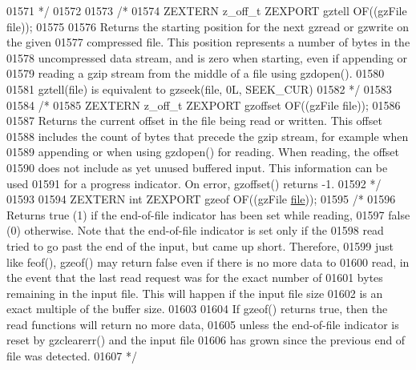 \begin{DoxyCode}
01571 \textcolor{comment}{*/}
01572 
01573 \textcolor{comment}{/*}
01574 \textcolor{comment}{ZEXTERN z\_off\_t ZEXPORT    gztell OF((gzFile file));}
01575 \textcolor{comment}{}
01576 \textcolor{comment}{     Returns the starting position for the next gzread or gzwrite on the given}
01577 \textcolor{comment}{   compressed file.  This position represents a number of bytes in the}
01578 \textcolor{comment}{   uncompressed data stream, and is zero when starting, even if appending or}
01579 \textcolor{comment}{   reading a gzip stream from the middle of a file using gzdopen().}
01580 \textcolor{comment}{}
01581 \textcolor{comment}{     gztell(file) is equivalent to gzseek(file, 0L, SEEK\_CUR)}
01582 \textcolor{comment}{*/}
01583 
01584 \textcolor{comment}{/*}
01585 \textcolor{comment}{ZEXTERN z\_off\_t ZEXPORT gzoffset OF((gzFile file));}
01586 \textcolor{comment}{}
01587 \textcolor{comment}{     Returns the current offset in the file being read or written.  This offset}
01588 \textcolor{comment}{   includes the count of bytes that precede the gzip stream, for example when}
01589 \textcolor{comment}{   appending or when using gzdopen() for reading.  When reading, the offset}
01590 \textcolor{comment}{   does not include as yet unused buffered input.  This information can be used}
01591 \textcolor{comment}{   for a progress indicator.  On error, gzoffset() returns -1.}
01592 \textcolor{comment}{*/}
01593 
01594 ZEXTERN \textcolor{keywordtype}{int} ZEXPORT gzeof OF((gzFile \hyperlink{structfile}{file}));
01595 \textcolor{comment}{/*}
01596 \textcolor{comment}{     Returns true (1) if the end-of-file indicator has been set while reading,}
01597 \textcolor{comment}{   false (0) otherwise.  Note that the end-of-file indicator is set only if the}
01598 \textcolor{comment}{   read tried to go past the end of the input, but came up short.  Therefore,}
01599 \textcolor{comment}{   just like feof(), gzeof() may return false even if there is no more data to}
01600 \textcolor{comment}{   read, in the event that the last read request was for the exact number of}
01601 \textcolor{comment}{   bytes remaining in the input file.  This will happen if the input file size}
01602 \textcolor{comment}{   is an exact multiple of the buffer size.}
01603 \textcolor{comment}{}
01604 \textcolor{comment}{     If gzeof() returns true, then the read functions will return no more data,}
01605 \textcolor{comment}{   unless the end-of-file indicator is reset by gzclearerr() and the input file}
01606 \textcolor{comment}{   has grown since the previous end of file was detected.}
01607 \textcolor{comment}{*/}

\end{DoxyCode}

